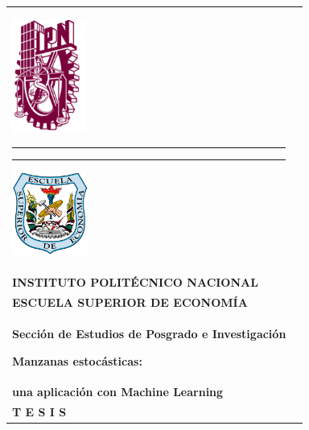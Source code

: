 \begin{titlepage}

\setlength{\voffset}{-0.5cm}
\setlength{\hoffset}{0.9cm}
\setlength{\headsep}{0pt}
\setlength{\headheight}{0pt}
\setlength{\oddsidemargin}{-0.8in}
\setlength{\marginparwidth}{-0.5cm}
\setlength{\textwidth}{15cm}
\setlength{\footskip}{2pt}
\setlength{\topmargin}{0in}
\setlength{\textheight}{27cm}
\setlength{\fboxrule}{3pt}


\begin{tabular}{p{2.4cm}p{14cm}}
\includegraphics[width=2.4cm]{IPN LOGO.png}
\begin{center}
\rule[2cm]{0.8mm}{15cm}%
\hspace{1pt}
\rule[2cm]{0.4mm}{15cm}%
\vspace{-2cm}
\includegraphics[width=2.5cm]{ESE LOGO.png}

\end{center}
&
\vspace{-3.5cm}
\begin{center}
\rule[1mm]{15cm}{0.4mm}%
\vspace{0.1pt}
\rule[3mm]{15cm}{0.8mm}%
\\
\LARGE{\bf{INSTITUTO POLITÉCNICO NACIONAL}}\\
\vspace*{0.3cm}
\Large{\bf{ESCUELA SUPERIOR DE ECONOMÍA}}\\
\vspace*{0.3cm}
\large{\bf{Sección de Estudios de Posgrado e Investigación}}

\vspace{2\baselineskip}
{\Large \bf{Manzanas estocásticas:}}\\
\vspace*{0.2cm}
{\Large \bf{una aplicación con Machine Learning}}\\
\vspace*{1.6cm}
\LARGE{\bf T E S I S}


\end{center}
\end{tabular}
\end{titlepage}
